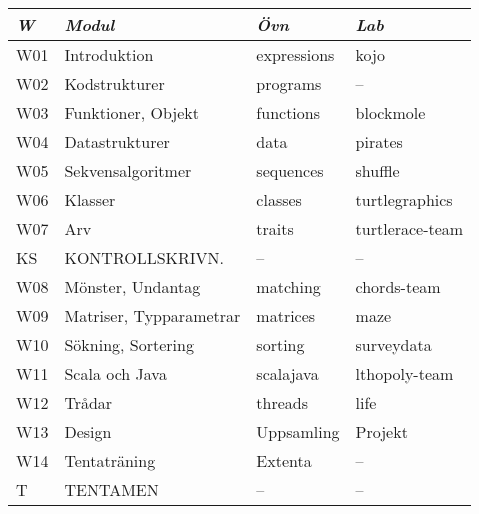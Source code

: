 \begin{tabular}{l|l|l|l}
\textit{W} & \textit{Modul} & \textit{Övn} & \textit{Lab} \\ \hline \hline
W01 & Introduktion            & expressions & kojo            \\
W02 & Kodstrukturer           & programs    & --              \\
W03 & Funktioner, Objekt      & functions   & blockmole       \\
W04 & Datastrukturer          & data        & pirates         \\
W05 & Sekvensalgoritmer       & sequences   & shuffle         \\
W06 & Klasser                 & classes     & turtlegraphics  \\
W07 & Arv                     & traits      & turtlerace-team \\
KS  & KONTROLLSKRIVN.         & --          & --              \\
W08 & Mönster, Undantag       & matching    & chords-team     \\
W09 & Matriser, Typparametrar & matrices    & maze            \\
W10 & Sökning, Sortering      & sorting     & surveydata      \\
W11 & Scala och Java          & scalajava   & lthopoly-team   \\
W12 & Trådar                  & threads     & life            \\
W13 & Design                  & Uppsamling  & Projekt         \\
W14 & Tentaträning            & Extenta     & --              \\
T   & TENTAMEN                & --          & --              \\
\end{tabular}
